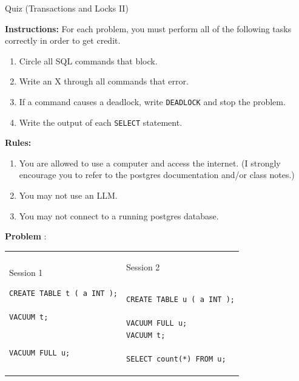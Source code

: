 \documentclass[10pt]{article}
\theoremstyle{definition}
\newcounter{ProblemCounter}
\newcommand{\nextproblem}{\filbreak\stepcounter{ProblemCounter} \noindent\textbf{Problem \theProblemCounter}:}
\begin{document}
\begin{center}
{
\Large
    Quiz (Transactions and Locks II)
}

    \vspace{0.1in}
\end{center}

\noindent
\textbf{Instructions:}
For each problem, you must perform all of the following tasks correctly in order to get credit.
\begin{enumerate}
\item Circle all SQL commands that block.
\item Write an X through all commands that error.
\item If a command causes a deadlock, write \lstinline{DEADLOCK} and stop the problem.
\item Write the output of each \lstinline{SELECT} statement.
\end{enumerate}
\textbf{Rules:}
\begin{enumerate}
    \item You are allowed to use a computer and access the internet.
        (I strongly encourage you to refer to the postgres documentation and/or class notes.)
    \item You may not use an LLM.
    \item You may not connect to a running postgres database.
\end{enumerate}

\vspace{0.5in} 

\nextproblem
\begin{tcolorbox}
\begin{tabular}{p{3.25in}p{3in}}
\hspace{-0.2in}Session 1
\begin{lstlisting}
CREATE TABLE t ( a INT );

VACUUM t;
  

VACUUM FULL u;

\end{lstlisting}
    &
\hspace{-0.2in}Session 2
\begin{lstlisting}

CREATE TABLE u ( a INT );

VACUUM FULL u;
VACUUM t;

SELECT count(*) FROM u;
\end{lstlisting}
\end{tabular}
\end{tcolorbox}
\vspace{0.25in}
\end{document}
